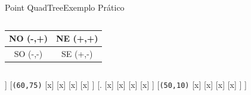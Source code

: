 \documentclass[red, tikz, aspectratio=169, xcolor=dvipsnames]{beamer}
\begin{document}
			\begin{frame}[fragile]{Point QuadTree}{Exemplo Prático}
				\centering
				\vspace{-40px}
				\begin{columns}
					\begin{column}{0.48\textwidth}
						\centering
						\begin{tabular}{|c|c|}
							\hline 
							NO (-,+) & NE (+,+) \\ 
							\hline 
							SO (-,-) & SE (+,-) \\ 
							\hline 
						\end{tabular} 
					\end{column}
					\begin{column}{0.5\textwidth}
						\centering
						\fbox{
							\begin{forest}
								[\texttt{(x,y)}
								[NO]
								[NE]
								[SO]
								[SE]
								]
						\end{forest}}
					\end{column}
				\end{columns}
				\vspace{10px}
				
				\vspace{10px}
				
				\begin{minipage}{\textwidth}
					\centering
					
					\begin{forest}
						[\texttt{(35,40)}
						[.
						[x]
						[x]
						[x]
						[x]
						]
						[\texttt{(60,75)}
						[x]
						[x]
						[x]
						[x]
						]
						[.
						[x]
						[x]
						[x]
						[x]
						]
						[\texttt{(50,10)}
						[x]
						[x]
						[x]
						[x]
						]
						]
					\end{forest}
				\end{minipage}
			\end{frame}
			
\end{document}
